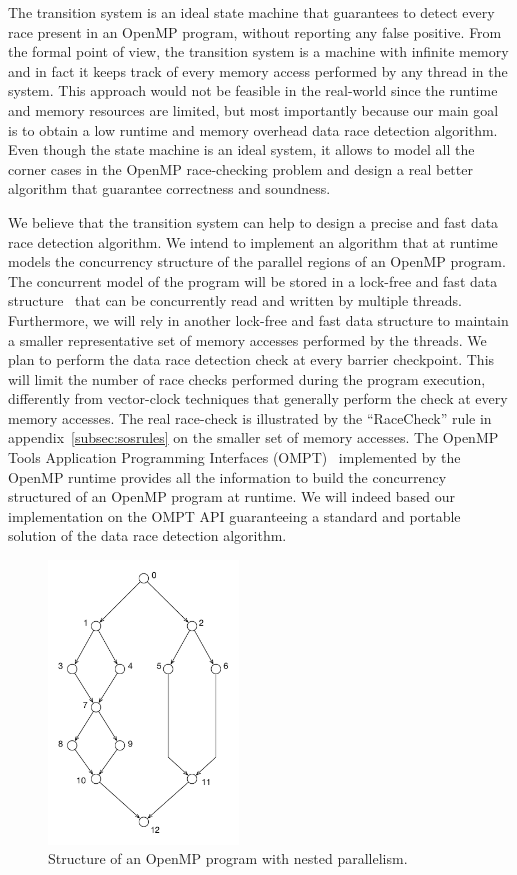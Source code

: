 The transition system is an ideal state machine that guarantees to detect
every race present in an OpenMP program, without reporting any false positive.
%
From the formal point of view, the transition system is a machine with
infinite memory and in fact it keeps track of every memory access performed by
any thread in the system.
%
This approach would not be feasible in the real-world since the runtime and
memory resources are limited, but most importantly because our main goal is to
obtain a low runtime and memory overhead data race detection algorithm.
%
Even though the state machine is an ideal system, it allows to model all the
corner cases in the OpenMP race-checking problem and design a real better
algorithm that guarantee correctness and soundness.

We believe that the transition system can help to design a precise and fast
data race detection algorithm.
%
We intend to implement an algorithm that at runtime models the concurrency
structure of the parallel regions of an OpenMP program.
%
The concurrent model of the program will be stored in a lock-free and fast
data structure~\cite{5871597, Matveev:2015:RLS:2815400.2815406} that can
be concurrently read and written by multiple threads.
%
Furthermore, we will rely in another lock-free and fast data structure to
maintain a smaller representative set of memory accesses performed by the
threads.
%
We plan to perform the data race detection check at every barrier checkpoint.
%
This will limit the number of race checks performed during the program
execution, differently from vector-clock techniques that generally perform the
check at every memory accesses.
%
The real race-check is illustrated by the ``RaceCheck'' rule in
appendix~\ref{subsec:sosrules} on the smaller set of memory accesses.
%
The OpenMP Tools Application Programming Interfaces (OMPT)~\cite{ompt}
implemented by the OpenMP runtime provides all the information to build the
concurrency structured of an OpenMP program at runtime.
%
We will indeed based our implementation on the OMPT API guaranteeing a
standard and portable solution of the data race detection algorithm.

\begin{figure}
  \centering
  \includegraphics[width=0.45\textwidth]{figures/example01}
  \caption{Structure of an OpenMP program with nested parallelism.}
  \label{fig:example01}
\end{figure}

